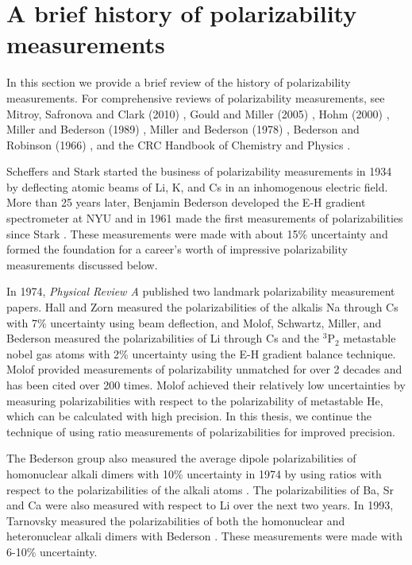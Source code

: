 \section{A brief history of polarizability measurements}
\label{introPolHistory}
In this section we provide a brief review of the history of polarizability measurements. For comprehensive reviews of polarizability measurements, see Mitroy, Safronova and Clark (2010) \cite{Mit10}, Gould and Miller (2005) \cite{Gou05}, Hohm (2000) \cite{Hoh00}, Miller and Bederson (1989) \cite{Mil89}, Miller and Bederson (1978) \cite{Mil78}, Bederson and Robinson (1966) \cite{Bed66}, and the CRC Handbook of Chemistry and Physics \cite{Mil12}. 

Scheffers and Stark started the business of polarizability measurements in 1934 \cite{Sch34} by deflecting atomic beams of Li, K, and Cs in an inhomogenous electric field. More than 25 years later, Benjamin Bederson developed the E-H gradient spectrometer at NYU \cite{Bed60} and in 1961 made the first measurements of polarizabilities since Stark \cite{Sal61}. These measurements were made with about 15\% uncertainty and formed the foundation for a career's worth of impressive polarizability measurements discussed below. 

In 1974, \emph{Physical Review A} published two landmark polarizability measurement papers. Hall and Zorn \cite{Hal74} measured the polarizabilities of the alkalis Na through Cs with 7\% uncertainty using beam deflection, and Molof, Schwartz, Miller, and Bederson \cite{Mol74} measured the polarizabilities of Li through Cs and the $^3\textrm{P}_2$ metastable nobel gas atoms with 2\% uncertainty using the E-H gradient balance technique. Molof \etal provided measurements of polarizability unmatched for over 2 decades and has been cited over 200 times. Molof \etal achieved their relatively low uncertainties by measuring polarizabilities with respect to the polarizability of metastable He, which can be calculated with high precision. In this thesis, we continue the technique of using ratio measurements of polarizabilities for improved precision.

The Bederson group also measured the average dipole polarizabilities of homonuclear alkali dimers with 10\% uncertainty in 1974 by using ratios with respect to the polarizabilities of the alkali atoms \cite{Mol74a}. The polarizabilities of Ba, Sr \cite{Sch74} and Ca \cite{Mil76} were also measured with respect to Li over the next two years. In 1993, Tarnovsky \etal measured the polarizabilities of both the homonuclear and heteronuclear alkali dimers with Bederson \cite{Tar93}. These measurements were made with 6-10\% uncertainty.

